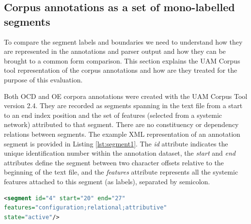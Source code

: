 \subsection{Corpus annotations as a set of mono-labelled segments}

    To compare the segment labels and boundaries we need to understand how they are represented in the annotations and parser output and how they can be brought to a common form comparison. This section explains the UAM Corpus tool representation of the corpus annotations and how are they treated for the purpose of this evaluation.
    
    Both OCD and OE corpora annotations were created with the UAM Corpus Tool \citep{ODonnell2008,ODonnell2008a} version 2.4. They are recorded as segments spanning in the text file from a start to an end index position and the set of features (selected from a systemic network) attributed to that segment. There are no constituency or dependency relations between segments. The example XML representation of an annotation segment is provided in Listing \ref{lst:segment1}. The \textit{id} attribute indicates the unique identification number within the annotation dataset, the \textit{start} and \textit{end} attributes define the segment between two character offsets relative to the beginning of the text file, and the \textit{features} attribute represents all the systemic features attached to this segment (as labels), separated by semicolon. 

\begin{minipage}{\linewidth}
\begin{lstlisting}[language=XML,basicstyle=\small\tt,frame=single,caption=Segment example in UAM corpus tool,label=lst:segment1]
<segment id="4" start="20" end="27" 
features="configuration;relational;attributive" 
state="active"/>
\end{lstlisting}
\end{minipage}

